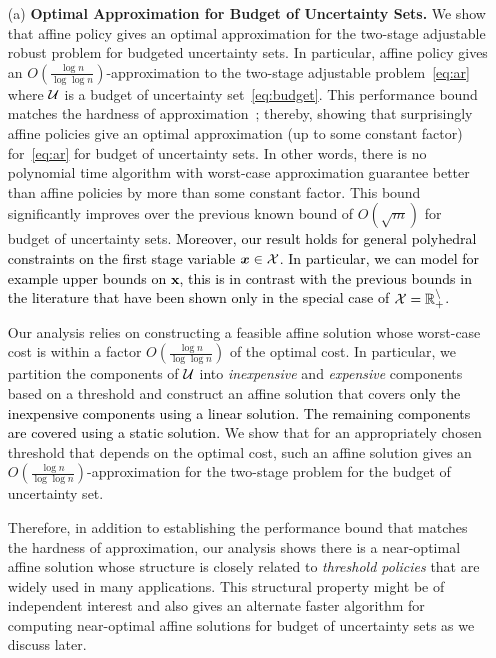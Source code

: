 \documentclass[moor]{informs1}              %
\newcommand{\mb}[1]{\ensuremath{\boldsymbol{#1}}}
\newcommand*{\red}{\textcolor{black}}
\begin{document}
\begin{enumerate}
\item[(a)] {\bf Optimal Approximation for Budget of Uncertainty Sets.} We show that affine policy gives an optimal approximation for the two-stage adjustable robust problem for budgeted uncertainty sets. In particular, affine policy gives an $O(\frac{\log n}{\log \log n})$-approximation to the two-stage adjustable problem~\eqref{eq:ar} where $\cal U$ is a budget of uncertainty set~\eqref{eq:budget}.  This performance bound matches the hardness of approximation~\cite{FJMM07}; thereby, showing that surprisingly affine policies give an optimal approximation (up to some constant factor) for~\eqref{eq:ar} for budget of uncertainty sets. In other words, there is no polynomial time algorithm with worst-case approximation guarantee better than affine policies by more than some constant factor. This bound significantly improves over the previous known bound of $O(\sqrt{m})$ \cite{BG10, bertsimas2014performance} for budget of uncertainty sets. \red{ Moreover, our result holds for general polyhedral constraints on the first stage variable $ \mb x \in \cal X$. In particular, we can model for example upper bounds on $\mb x$, this is in contrast  with the previous bounds in the literature that have been shown only in the special case of  $\cal X = \mathbb{R}_+^n$. }

Our analysis relies on constructing a feasible affine solution whose worst-case cost is within a factor $O( \frac{\log n}{\log \log n} )$ of the optimal cost. In particular, we partition the components of $\cal U$ into {\em inexpensive} and {\em expensive} components based on a threshold and construct an affine solution that covers \red{only the inexpensive components using a linear solution}. \red{The remaining components are covered using a static solution.} We show that for an appropriately chosen threshold that depends on the optimal cost, such an affine solution gives an $O(\frac{\log n}{\log \log n})$-approximation for the two-stage problem for the budget of uncertainty set. 

Therefore, in addition to establishing the performance bound that matches the hardness of approximation, our analysis shows there is a near-optimal affine solution whose structure is closely related to {\em threshold policies} that are widely used in many applications. This structural property might be of independent interest and also gives an alternate faster algorithm for computing near-optimal affine solutions for budget of uncertainty sets as we discuss later.



\end{enumerate}
\end{document}
